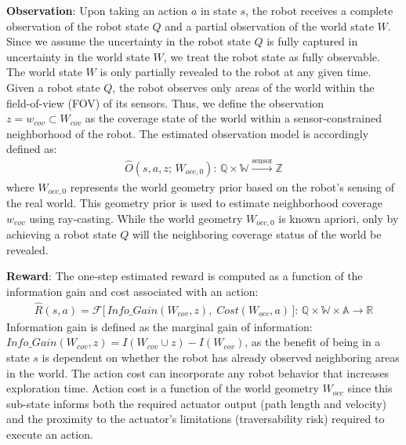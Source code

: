 \documentclass{article}
\newcommand{\ph}[1]{{\textbf{#1}:}} %
\begin{document}
\ph{Observation} Upon taking an action $a$ in state $s$, the robot receives a complete observation of the robot state $Q$ and a partial observation of the world state $W$. Since we assume the uncertainty in the robot state $Q$ is fully captured in uncertainty in the world state $W$, we treat the robot state as fully observable. The world state $W$ is only partially revealed to the robot at any given time. Given a robot state $Q$, the robot observes only areas of the world within the field-of-view (FOV) of its sensors. Thus, we define the observation $z = w_{cov} \subset W_{cov}$ as the coverage state of the world within a sensor-constrained neighborhood of the robot. The estimated observation model is accordingly defined as:
\begin{align}
   \hat{O}(s, a, z; \, W_{occ,0}): \, \mathbb{Q} \times \mathbb{W} \xrightarrow{\text{sensor}} \mathbb{Z}
\end{align}
where $W_{occ,0}$ represents the world geometry prior based on the robot's sensing of the real world. This geometry prior is used to estimate neighborhood coverage $w_{cov}$ using ray-casting. While the world geometry $W_{occ,0}$ is known apriori, only by achieving a robot state $Q$ will the neighboring coverage status of the world be revealed.   


\ph{Reward} The one-step estimated reward is computed as a function of the information gain and cost associated with an action:
\begin{align}
    \hat{R}(s, a) = \mathcal{F}\Big[\, \textit{Info\_Gain}(W_{cov}, z), \; \textit{Cost}(W_{occ}, a) \, \Big]: \, \mathbb{Q} \times \mathbb{W} \times \mathbb{A} \rightarrow \mathbb{R} 
\end{align}
Information gain is defined as the marginal gain of information: $\textit{Info\_Gain}(W_{cov}, z) = I(W_{cov} \cup z) - I(W_{cov})$, as the benefit of being in a state $s$ is dependent on whether the robot has already observed neighboring areas in the world. The action cost can incorporate any robot behavior that increases exploration time. Action cost is a function of the world geometry $W_{occ}$ since this sub-state informs both the required actuator output (path length and velocity) and the proximity to the actuator's limitations (traversability risk) required to execute an action.
\end{document}
